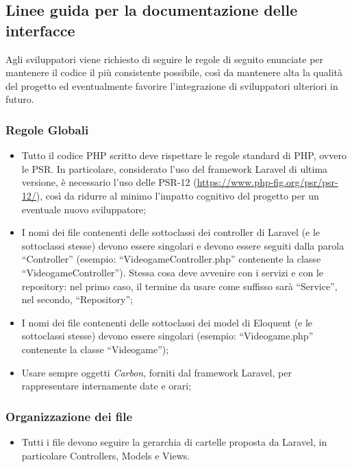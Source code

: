 \subsection{Linee guida per la documentazione delle interfacce}
Agli sviluppatori viene richiesto di seguire le regole di seguito enunciate per mantenere il codice il più consistente possibile, così da mantenere alta la qualità del progetto ed eventualmente favorire l’integrazione di sviluppatori ulteriori in futuro.

\subsubsection{Regole Globali}
\begin{itemize}
	\item Tutto il codice PHP scritto deve rispettare le regole standard di PHP, ovvero le PSR. In particolare, considerato l’uso del framework Laravel di ultima versione, è necessario l’uso delle PSR-12 (\url{https://www.php-fig.org/psr/psr-12/}), così da ridurre al minimo l’impatto cognitivo del progetto per un eventuale nuovo sviluppatore;
	\item I nomi dei file contenenti delle sottoclassi dei controller di Laravel (e le sottoclassi stesse) devono essere singolari e devono essere seguiti dalla parola “Controller” (esempio: “VideogameController.php” contenente la classe “VideogameController”). Stessa cosa deve avvenire con i servizi e con le repository: nel primo caso, il termine da usare come suffisso sarà “Service”, nel secondo, “Repository”;
	\item I nomi dei file contenenti delle sottoclassi dei model di Eloquent (e le sottoclassi stesse) devono essere singolari (esempio: “Videogame.php” contenente la classe “Videogame”);
	\item Usare sempre oggetti \emph{Carbon}, forniti dal framework Laravel, per rappresentare internamente date e orari;
\end{itemize}

\subsubsection{Organizzazione dei file}
\begin{itemize}
	\item Tutti i file devono seguire la gerarchia di cartelle proposta da Laravel, in particolare Controllers, Models e Views.
\end{itemize}

